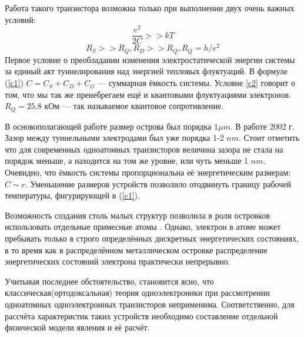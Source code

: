 \documentclass[12pt,a4paper]{report}
\begin{document}
Работа такого транзистора возможна только при выполнении двух очень важных условий:
\begin{equation}\label{c1}
\frac{e^2}{2C} >> kT
\end{equation}
\begin{equation}\label{c2}
R_S >> R_Q, R_D >> R_Q,  R_Q = h/e^2
\end{equation}
Первое условие о преобладании изменения электростатической энергии системы за единый акт туннелирования над энергией тепловых флуктуаций. В формуле (\ref{c1}) $C = C_S + C_D + C_G$ — суммарная ёмкость системы. Условие \ref{c2} говорит о том, что мы так же пренебрегаем ещё и квантовыми флуктуациями электронов. $R_Q = 25.8$ кОм — так называемое квантовое сопротивление.

В основополагающей работе \cite{Fulton_Dolan} размер острова был порядка $1\mu m$. В работе 2002 г. \cite{SASET1} Зазор между туннельными электродами был уже порядка 1-2 $nm$. Стоит отметить что для современных одноатомных транзисторов величина зазора не стала на порядок меньше, а находится на том же уровне, или чуть меньше 1 $nm$. Очевидно, что ёмкость системы пропорциональна её энергетическим размерам: $C \sim r$. Уменьшение размеров устройств позволило отодвинуть границу рабочей температуры, фигурирующей в (\ref{c1}).

Возможность создания столь малых структур позволила в роли островков использовать отдельные примесные атомы \cite{SASET_EXP_OUR, SMSET}. Однако, электрон в атоме может пребывать только в строго определённых дискретных энергетических состояниях, в то время как в распределённом металлическом островке распределение энергетических состояний электрона практически непрерывно.

Учитывая последнее обстоятельство, становится ясно, что классическая(ортодоксальная)\cite{Likharev} теория одноэлектроники при рассмотрении одноатомных одноэлектронных транзисторов  неприменима. Соответственно, для рассчёта характеристик таких устройств необходимо составление отдельной физической модели явления и её расчёт.
\end{document}
